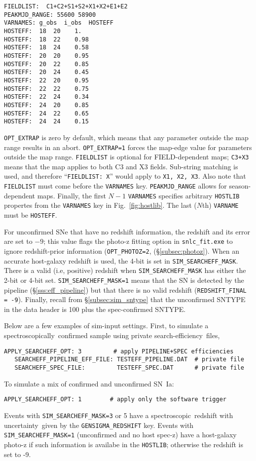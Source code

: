 \documentclass[12pt]{article}
\newcommand{\unc}{uncertainty}
\newcommand{\eff}{efficiency}
\newcommand{\spec}{spectroscopic}
\newcommand{\specy}{spectroscopically}
\begin{document}
{\begin{Verbatim}[frame=single]
FIELDLIST:  C1+C2+S1+S2+X1+X2+E1+E2
PEAKMJD_RANGE: 55600 58900 
VARNAMES: g_obs  i_obs  HOSTEFF
HOSTEFF:  18  20    1.
HOSTEFF:  18  22    0.98
HOSTEFF:  18  24    0.58
HOSTEFF:  20  20    0.95
HOSTEFF:  20  22    0.85
HOSTEFF:  20  24    0.45
HOSTEFF:  22  20    0.95
HOSTEFF:  22  22    0.75
HOSTEFF:  22  24    0.34
HOSTEFF:  24  20    0.85
HOSTEFF:  24  22    0.65
HOSTEFF:  24  24    0.15
\end{Verbatim} 
%
{\tt OPT\_EXTRAP} is zero by default, which means that any 
parameter outside the map range results in an abort.
{\tt OPT\_EXTRAP=1} forces the map-edge value for parameters outside 
the map range. {\tt FIELDLIST} is optional for FIELD-dependent maps;
{\tt C3+X3} means that the map applies to both C3 and X3 fields.
Sub-string matching is used, and therefore ``{\tt FIELDLIST: X}'' 
would apply to {\tt X1, X2, X3}.
Also note that {\tt FIELDLIST} must come before the {\tt VARNAMES} key.
{\tt PEAKMJD\_RANGE} allows for season-dependent maps.
Finally, the first $N-1$ {\tt VARNAMES} specifies arbitrary
{\tt HOSTLIB} propertes from the {\tt VARNAMES} key in 
Fig.~\ref{fig:hostlib}. The last ($N$th) {\tt VARNAME} must be {\tt HOSTEFF}.


\clearpage
For unconfirmed SNe that have no redshift information,
the redshift and its error are set to $-9$; 
this value flags the photo-z fitting option in {\tt snlc\_fit.exe}
to ignore redshift-prior information
({\tt OPT\_PHOTOZ=2}, (\S\ref{subsec:photoz}).
When an accurate host-galaxy redshift is used, 
the 4-bit is set in {\tt SIM\_SEARCHEFF\_MASK}. 
There is a valid (i.e, positive) redshift when 
{\tt SIM\_SEARCHEFF\_MASK} has either the 2-bit or 4-bit set.
{\tt SIM\_SEARCHEFF\_MASK=1} means that the SN is
detected by the pipeline (\S\ref{sss:eff_pipeline})
but that there is no valid redshift
({\tt REDSHIFT\_FINAL = -9}).
Finally, recall from \S\ref{subsec:sim_sntype} 
that the unconfirmed SNTYPE in the data header is 
100 plus the spec-confirmed SNTYPE.


Below are a few examples of sim-input settings.
First, to simulate a \specy\ confirmed sample
using private search-\eff\ files,
%
\begin{Verbatim}[frame=single]
   APPLY_SEARCHEFF_OPT: 3         # apply PIPELINE+SPEC efficiencies
   SEARCHEFF_PIPELINE_EFF_FILE: TESTEFF_PIPELINE.DAT  # private file
   SEARCHEFF_SPEC_FILE:         TESTEFF_SPEC.DAT      # private file
\end{Verbatim}
%
To simulate a mix of confirmed and unconfirmed SN~Ia:
%
\begin{Verbatim}[frame=single]
   APPLY_SEARCHEFF_OPT: 1        # apply only the software trigger
\end{Verbatim}
Events with {\tt SIM\_SEARCHEFF\_MASK=3} or 5 have a \spec\ redshift
with \unc\ given by the {\tt GENSIGMA\_REDSHIFT} key.
Events with {\tt SIM\_SEARCHEFF\_MASK=1} (unconfirmed and no
host spec-z) have a host-galaxy photo-z
if such information is availabe in the {\tt HOSTLIB};
otherwise the redshift is set to -9.

}
\end{document}
